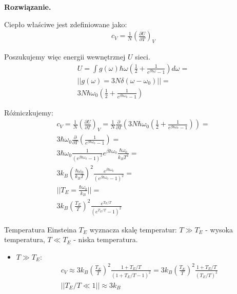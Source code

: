 \documentclass[11pt,a4paper]{article}
\newenvironment{solution}{\vspace{1cm} \par\textbf{Rozwiązanie.} \vspace{1cm}}{}
\begin{document}
\begin{solution}

Ciepło właściwe jest zdefiniowane jako:
\begin{align*}
  c_V = \frac{1}{N} \left( \frac{\partial U}{\partial T} \right)_V
\end{align*}

Poszukujemy więc energii wewnętrznej $U$ sieci.
\begin{align*}
  U = \int g(\omega) \hbar \omega \left( \frac{1}{2} + \frac{1}{e^{\beta \hbar \omega} - 1} \right) d\omega = \\
  || g(\omega) = 3N \delta(\omega - \omega_0) || = \\
  3N \hbar \omega_0 \left( \frac{1}{2} + \frac{1}{e^{\beta \hbar \omega_0} - 1} \right)
\end{align*}

Różniczkujemy:
\begin{align*}
  c_V = \frac{1}{N} \left( \frac{\partial U}{\partial T} \right)_V = \frac{1}{N} \frac{\partial}{\partial T} \left( 3N \hbar \omega_0 \left( \frac{1}{2} + \frac{1}{e^{\beta \hbar \omega_0} - 1} \right) \right) = \\
  3 \hbar \omega_0 \frac{\partial}{\partial T} \left( \frac{1}{e^{\beta \hbar \omega_0} - 1} \right) = \\
  3 \hbar \omega_0 \frac{1}{(e^{\beta \hbar \omega_0} - 1)^2} e^{\beta \hbar \omega_0} \frac{\hbar \omega_0}{k_B T^2} = \\
  3 k_B\left( \frac{\hbar \omega_0}{k_B T} \right)^2 \frac{e^{\beta \hbar \omega_0}}{(e^{\beta \hbar \omega_0} - 1)^2} = \\
  || T_E = \frac{\hbar \omega_0}{k_B} || = \\
  3 k_B \left( \frac{T_E}{T} \right)^2 \frac{e^{T_E/T}}{(e^{T_E/T} - 1)^2}
\end{align*}

Temperatura Einsteina $T_E$ wyznacza skalę temperatur:
$T \gg T_E$ - wysoka temperatura, $T \ll T_E$ - niska temperatura.

\begin{itemize}
  \item  $T \gg T_E$:
  \begin{align*}
    c_V \approx 3 k_B \left( \frac{T_E}{T} \right)^2 \frac{1 + T_E/T}{(1 + T_E/T - 1)^2} 
    = 3 k_B \left( \frac{T_E}{T} \right)^2 \frac{1 + T_E/T}{(T_E/T)^2}  \\
    || T_E/T \ll 1 || \approx 3 k_B
  \end{align*}


\end{itemize}
\end{solution}
\end{document}
